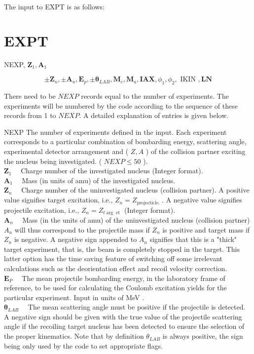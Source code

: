 \documentclass[10pt]{article}
\begin{document}
The input to EXPT is as follows:

\section*{EXPT}
NEXP, $\mathbf{Z}_{1}, \mathbf{A}_{1}$

$$
\pm \mathbf{Z}_{n}, \pm \mathbf{A}_{n}, \mathbf{E}_{p}, \pm \boldsymbol{\theta}_{L A B}, \mathbf{M}_{c}, \mathbf{M}_{a}, \mathbf{I A X}, \phi_{1}, \phi_{2}, \text { IKIN }, \mathbf{L N}
$$

There need to be $N E X P$ records equal to the number of experiments. The experiments will be numbered by the code according to the sequence of these records from 1 to $N E X P$. A detailed explanation of entries is given below.

NEXP The number of experiments defined in the input. Each experiment corresponds to a particular combination of bombarding energy, scattering angle, experimental detector arrangement and ( $Z, A$ ) of the collision partner exciting the nucleus being investigated. ( $N E X P \leq 50$ ).\\
$\mathbf{Z}_{1} \quad$ Charge number of the investigated nucleus (Integer format).\\
$\mathbf{A}_{1} \quad$ Mass (in units of amu) of the investigated nucleus.\\
$\mathbf{Z}_{n} \quad$ Charge number of the uninvestigated nucleus (collision partner). A positive value signifies target excitation, i.e., $Z_{n}=Z_{\text {projecticle. }}$. A negative value signifies projectile excitation, i.e., $Z_{n}=Z_{t \arg \text { et }}$ (Integer format).\\
$\mathbf{A}_{n} \quad$ Mass (in the units of amu) of the uninvestigated nucleus (collision partner) $A_{n}$ will thus correspond to the projectile mass if $Z_{n}$ is positive and target mass if $Z_{n}$ is negative. A negative sign appended to $A_{n}$ signifies that this is a "thick" target experiment, that is, the beam is completely stopped in the target. This latter option has the time saving feature of switching off some irrelevant calculations such as the deorientation effect and recoil velocity correction.\\
$\mathbf{E}_{P} \quad$ The mean projectile bombarding energy, in the laboratory frame of reference, to be used for calculating the Coulomb excitation yields for the particular experiment. Input in units of MeV .\\
$\boldsymbol{\theta}_{L A B} \quad$ The mean scattering angle must be positive if the projectile is detected. A negative sign should be given with the true value of the projectile scattering angle if the recoiling target nucleus has been detected to ensure the selection of the proper kinematics. Note that by definition $\theta_{L A B}$ is always positive, the sign being only used by the code to set appropriate flags.\\
\end{document}
